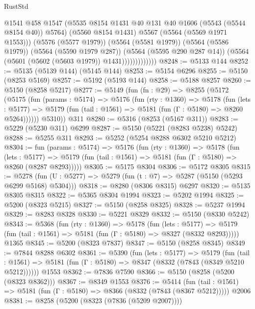 \begin{lexlean}{RustStd}
\begin{coremodule}
                            @1541
                            @458
                            @1547
                            (@5535 @8154 @1431 @40 @131 @40 @1606 (@5543 (@5544 @8154 @40)) @5764)
                            (@5560 @8154 @1431)
                            @5567
                            (@5564 (@5569 @1971 @1553)))
                          (@5576 (@5577 @1979))
                          (@5564 (@5581 @1979))
                          (@5564 (@5586 @1979))
                          (@5564 (@5590 @1979 @287))
                          (@5564 (@5595 @290 @287 @14))
                          (@5564 (@5601 (@5602 (@5603 @1979)) @1431)))))))))))))
@8248 := @5133 @144
@8252 := @5135 (@5139 @144) (@5145 @144)
@8253 := @5154 @6296
@8255 := @5150 (@8253 @5169)
@8257 := @5192 (@5193 @144)
@8258 := @5188 @8257
@8260 := @5150 (@8258 @5217)
@8277 := @5149
    (fun (fn : @29) =>
    @8255
      (@5172
        (@5175
          (fun (params : @5174) =>
          @5176
            (fun (rty : @1360) =>
            @5178
              (fun (lets : @5177) =>
              @5179 (fun (tail : @1561) => @5181 (fun (Γ : @5180) => @8260 @5264))))))
        @5310))
    @311
@8280 := @5316 (@8253 (@5167 @311))
@8283 := @5229 (@5230 @311) @6299
@8287 := @5150 (@5221 (@8283 @5238) @5242)
@8288 := @5255 @311
@8293 := @5252 (@5254 @8288 @6302 @5210 @5212)
@8304 := fun (params : @5174) =>
  @5176
    (fun (rty : @1360) =>
    @5178
      (fun (lets : @5177) =>
      @5179 (fun (tail : @1561) => @5181 (fun (Γ : @5180) => @8260 (@8287 @8293)))))
@8305 := @5175 @8304
@8306 := @5172 @8305
@8315 := @5278 (fun (U : @5277) => @5279 (fun (t : @7) => @5287 (@5150 (@5293 @6299 @5168) @5304)))
@8318 := @8280 (@8306 @8315) @6297
@8320 := @5135 @8305 @8315
@8322 := @5365 @8304 @1994
@8323 := @5202 @1994
@8325 := @5200 (@8323 @5215)
@8327 := @5150 (@8258 @8325)
@8328 := @5237 @1994
@8329 := @8283 @8328
@8330 := @5221 @8329
@8332 := @5150 (@8330 @5242)
@8343 := @5368
    (fun (rty : @1360) =>
    @5178
      (fun (lets : @5177) =>
      @5179 (fun (tail : @1561) => @5181 (fun (Γ : @5180) => @8327 (@8332 @8293)))))
    @1365
@8345 := @5200 (@8323 @7837)
@8347 := @5150 (@8258 @8345)
@8349 := @7844 @8288 @6302
@8361 := @5390
    (fun (lets : @5177) =>
    @5179
      (fun (tail : @1561) => @5181 (fun (Γ : @5180) => @8347 (@8332 (@7843 (@8349 @5210 @5212))))))
    @1553
@8362 := @7836 @7590
@8366 := @5150 (@8258 (@5200 (@8323 @8362)))
@8367 := @8349 @1553
@8376 := @5414
    (fun (tail : @1561) => @5181 (fun (Γ : @5180) => @8366 (@8332 (@7843 (@8367 @5212)))))
    @2006
@8381 := @8258 (@5200 (@8323 (@7836 (@5209 @2007))))

\end{coremodule}
\end{lexlean}
